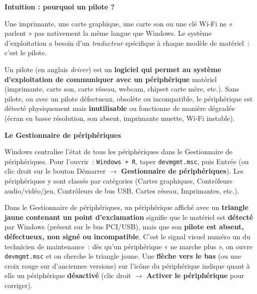 \documentclass[11pt]{article}
\newcommand{\cle}[1]{{\popxbold\color{popdark}#1}}
\begin{document}
\textbf{Intuition : pourquoi un pilote ?}

Une imprimante, une carte graphique, une carte son ou une clé Wi-Fi ne « parlent » pas nativement la même langue que Windows. Le système d'exploitation a besoin d'un \emph{traducteur} spécifique à chaque modèle de matériel~: c'est le pilote.

\begin{definition}
Un \cle{pilote} (en anglais \emph{driver}) est un \textbf{logiciel qui permet au système d'exploitation de communiquer avec un périphérique} matériel (imprimante, carte son, carte réseau, webcam, chipset carte mère, etc.). Sans pilote, ou avec un pilote défectueux, obsolète ou incompatible, le périphérique est détecté physiquement mais \textbf{inutilisable} ou fonctionne de manière dégradée (écran en basse résolution, son absent, imprimante muette, Wi-Fi instable).
\end{definition}

\textbf{Le Gestionnaire de périphériques}

Windows centralise l'état de tous les périphériques dans le \cle{Gestionnaire de périphériques}. Pour l'ouvrir~: \texttt{Windows + R}, taper \texttt{devmgmt.msc}, puis Entrée (ou clic droit sur le bouton Démarrer $\rightarrow$ \textbf{Gestionnaire de périphériques}). Les périphériques y sont classés par catégories (Cartes graphiques, Contrôleurs audio/vidéo/jeu, Contrôleurs de bus USB, Cartes réseau, Imprimantes, etc.).

\begin{savaistu}
Dans le Gestionnaire de périphériques, un périphérique affiché avec un \textbf{triangle jaune contenant un point d'exclamation} signifie que le matériel est \textbf{détecté} par Windows (présent sur le bus PCI/USB), mais que son \textbf{pilote est absent, défectueux, non signé ou incompatible}. C'est le signal visuel numéro un du technicien de maintenance~: dès qu'un périphérique « ne marche plus », on ouvre \texttt{devmgmt.msc} et on cherche le triangle jaune.
Une \textbf{flèche vers le bas} (ou une croix rouge sur d'anciennes versions) sur l'icône du périphérique indique quant à elle un périphérique \textbf{désactivé} (clic droit $\rightarrow$ \textbf{Activer le périphérique} pour corriger).
\end{savaistu}
\end{document}
